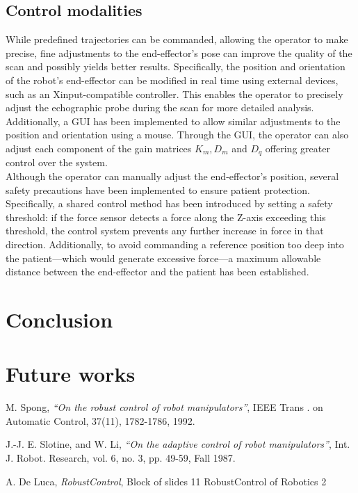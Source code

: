 \documentclass{article}
\begin{document}
\subsection{Control modalities}
While predefined trajectories can be commanded, allowing the operator to make precise, fine adjustments to the end-effector’s pose can improve the quality of the scan and possibly yields better results. Specifically, the position and orientation of the robot’s end-effector can be modified in real time using external devices, such as an Xinput-compatible controller. This enables the operator to precisely adjust the echographic probe during the scan for more detailed analysis.
\\
Additionally, a GUI has been implemented to allow similar adjustments to the position and orientation using a mouse. Through the GUI, the operator can also adjust each component of the gain matrices $K_{m}, D_{m}$ and $D_{q}$ offering greater control over the system.
\\
Although the operator can manually adjust the end-effector’s position, several safety precautions have been implemented to ensure patient protection. Specifically, a shared control method has been introduced by setting a safety threshold: if the force sensor detects a force along the Z-axis exceeding this threshold, the control system prevents any further increase in force in that direction. Additionally, to avoid commanding a reference position too deep into the patient—which would generate excessive force—a maximum allowable distance between the end-effector and the patient has been established.


\section{Conclusion}

\section{Future works}



\begin{thebibliography}{9}

  M. Spong,
  \emph{“On the robust control of robot manipulators”},
   IEEE Trans . on Automatic Control, 37(11), 1782-1786, 1992.

  J.-J. E. Slotine, and W. Li,
  \emph{“On the adaptive control of robot manipulators”},
  Int. J. Robot. Research, vol. 6, no. 3, pp. 49-59, Fall 1987.
   
  A. De Luca,
  \emph{RobustControl},
 Block of slides 11 RobustControl of Robotics 2

\end{thebibliography}
\end{document}
